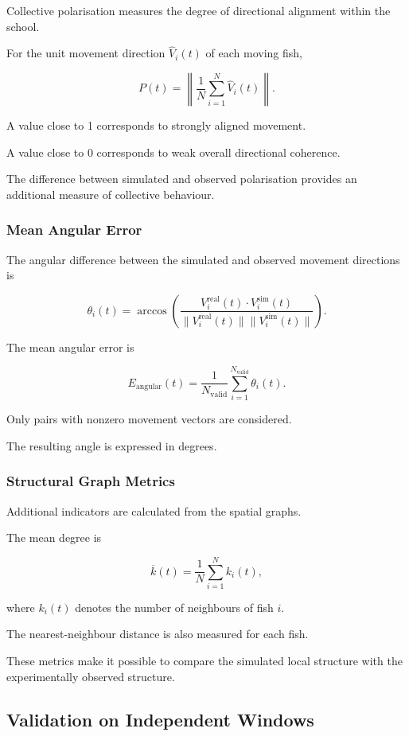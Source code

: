 \documentclass[10pt,a4paper]{article}
\begin{document}
Collective polarisation measures
the degree of directional alignment
within the school.

For the unit movement direction
$\widehat V_i(t)$ of each moving fish,

\[
P(t)
=
\left\|
\frac{1}{N}
\sum_{i=1}^{N}
\widehat V_i(t)
\right\|.
\]

A value close to 1 corresponds
to strongly aligned movement.

A value close to 0 corresponds
to weak overall directional coherence.

The difference between simulated
and observed polarisation provides
an additional measure of collective
behaviour.

\subsubsection{Mean Angular Error}

The angular difference between
the simulated and observed
movement directions is

\[
\theta_i(t)
=
\arccos
\left(
\frac{
V_i^{\mathrm{real}}(t)
\cdot
V_i^{\mathrm{sim}}(t)
}{
\|V_i^{\mathrm{real}}(t)\|
\|V_i^{\mathrm{sim}}(t)\|
}
\right).
\]

The mean angular error is

\[
E_{\mathrm{angular}}(t)
=
\frac{1}{N_{\mathrm{valid}}}
\sum_{i=1}^{N_{\mathrm{valid}}}
\theta_i(t).
\]

Only pairs with nonzero
movement vectors are considered.

The resulting angle is expressed
in degrees.

\subsubsection{Structural Graph Metrics}

Additional indicators are calculated
from the spatial graphs.

The mean degree is

\[
\overline k(t)
=
\frac{1}{N}
\sum_{i=1}^{N}k_i(t),
\]

where $k_i(t)$ denotes the
number of neighbours of fish $i$.

The nearest-neighbour distance
is also measured for each fish.

These metrics make it possible
to compare the simulated
local structure with the
experimentally observed structure.

\subsection{Validation on Independent Windows}
\end{document}
